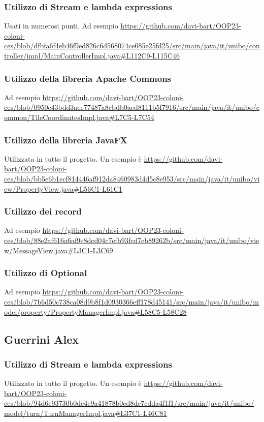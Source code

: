 \documentclass[a4paper,12pt]{report}
\begin{document}
\subsubsection{Utilizzo di Stream e lambda expressions}
Usati in numerosi punti. Ad esempio \url{https://github.com/davi-bart/OOP23-coloni-ces/blob/dfbfa6f4eb46f9ed826c6d568074ce085e25fd25/src/main/java/it/unibo/controller/impl/MainControllerImpl.java#L112C9-L115C46}
\subsubsection{Utilizzo della libreria Apache Commons}
Ad esempio \url{https://github.com/davi-bart/OOP23-coloni-ces/blob/0950c43bdd3aee77487a8cbdb0aed8111b5f7916/src/main/java/it/unibo/common/TileCoordinatesImpl.java#L7C5-L7C54}
\subsubsection{Utilizzo della libreria JavaFX}
Utilizzata in tutto il progetto. Un esempio \`e \url{https://github.com/davi-bart/OOP23-coloni-ces/blob/bb5e6b1ecf814446af912da8460983d4d5c8e953/src/main/java/it/unibo/view/PropertyView.java#L56C1-L61C1}
\subsubsection{Utilizzo dei record}
Ad esempio \url{https://github.com/davi-bart/OOP23-coloni-ces/blob/88e2af616a6af9e8dcd04c7efb93fcd7eb89262b/src/main/java/it/unibo/view/MessageView.java#L3C1-L3C69}
\subsubsection{Utilizzo di Optional}
Ad esempio \url{https://github.com/davi-bart/OOP23-coloni-ces/blob/7b6d50c738ca08d9b8f1d0930366eff178d45141/src/main/java/it/unibo/model/property/PropertyManagerImpl.java#L58C5-L58C28}

\subsection{Guerrini Alex}
\subsubsection{Utilizzo di Stream e lambda expressions}
Utilizzato in tutto il progetto. Un esempio \`e \url{https://github.com/davi-bart/OOP23-coloni-ces/blob/94d6e93730b0de4e9a41878b0cd8de7cdda4f1f1/src/main/java/it/unibo/model/turn/TurnManagerImpl.java#L37C1-L46C81}
\end{document}
